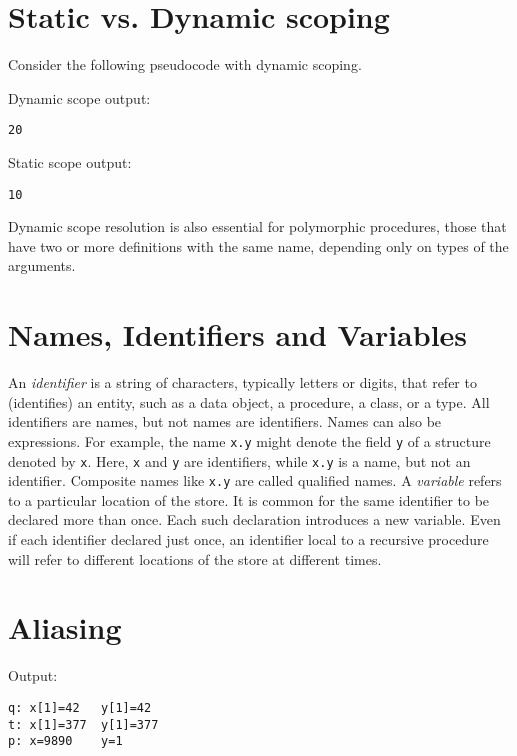 \documentclass[12pt,a4paper,oneside,draft]{report}
\newcommand{\cc}[1]{\texttt{#1}}
\begin{document}
\newpage

\section*{Static vs. Dynamic scoping}

\lstset{style=clanguage}
Consider the following pseudocode with dynamic scoping.


\lstset{style=codeoutput}
\noindent Dynamic scope output:
\begin{lstlisting}
20
\end{lstlisting}

\lstset{style=codeoutput}
\noindent Static scope output:
\begin{lstlisting}
10
\end{lstlisting}

Dynamic scope resolution is also essential for polymorphic procedures, those that have two or more definitions with the same name, depending only on types of the arguments.

\section*{Names, Identifiers and Variables}
\indent\indent An \emph{identifier} is a string of characters, typically letters or digits, that refer to (identifies) an entity, such as a data object, a procedure, a class, or a type. All identifiers are names, but not names are identifiers. Names can also be expressions. For example, the name \cc{x.y} might denote the field \cc{y} of a structure denoted by \cc{x}. Here, \cc{x} and \cc{y} are identifiers, while \cc{x.y} is a name, but not an identifier. Composite names like \cc{x.y} are called qualified names.
\indent A \emph{variable} refers to a particular location of the store. It is common for the same identifier to be declared more than once. Each such declaration introduces a new variable. Even if each identifier declared just once, an identifier local to a recursive procedure will refer to different locations of the store at different times.

\newpage
\section*{Aliasing}
\lstset{style=clanguage}

\lstset{style=codeoutput}
Output:
\begin{lstlisting}
q: x[1]=42	 y[1]=42
t: x[1]=377	 y[1]=377
p: x=9890	 y=1
\end{lstlisting}
\end{document}
